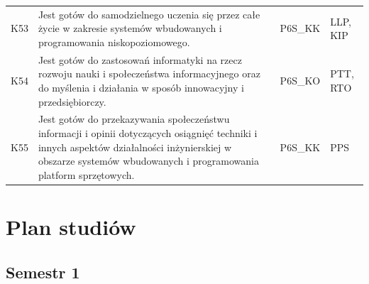 \documentclass[12pt,a4paper]{article}
\begin{document}
{\begin{longtable}{m{1cm}m{8.8cm}m{2.1cm}m{2.5cm}}
\rowcolor{tableRowLight} K53 & Jest gotów do samodzielnego uczenia się przez całe życie w zakresie systemów wbudowanych i programowania niskopoziomowego. & {\scriptsize P6S\_KK} & {\scriptsize LLP, KIP} \\
\rowcolor{tableRowAlt} K54 & Jest gotów do zastosowań informatyki na rzecz rozwoju nauki i społeczeństwa informacyjnego oraz do myślenia i działania w sposób innowacyjny i przedsiębiorczy. & {\scriptsize P6S\_KO} & {\scriptsize PTT, RTO} \\
\rowcolor{tableRowLight} K55 & Jest gotów do przekazywania społeczeństwu informacji i opinii dotyczących osiągnięć techniki i innych aspektów działalności inżynierskiej w obszarze systemów wbudowanych i programowania platform sprzętowych. & {\scriptsize P6S\_KK} & {\scriptsize PPS} \\
\bottomrule
\end{longtable}}



\newpage

\section{Plan studiów}


\bigskip

\subsection*{Semestr 1}
\end{document}
